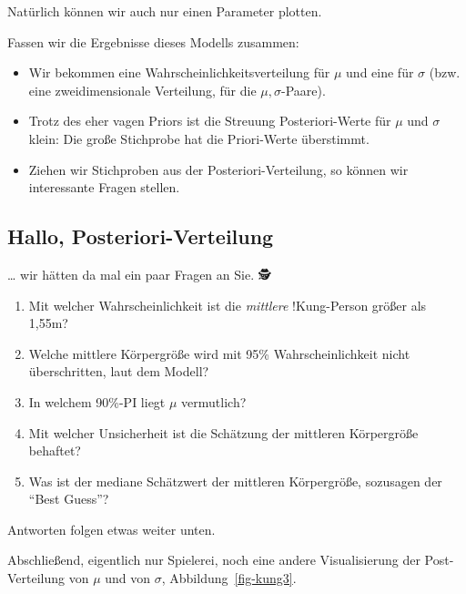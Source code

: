 \documentclass[
  a4paper,
  DIV=11]{scrreprt}
\providecommand{\tightlist}{%
  \setlength{\itemsep}{0pt}\setlength{\parskip}{0pt}}\usepackage{longtable,booktabs,array}
\theoremstyle{definition}
\theoremstyle{remark}
\begin{document}
Natürlich können wir auch nur einen Parameter plotten.

Fassen wir die Ergebnisse dieses Modells zusammen:

\begin{itemize}
\item
  Wir bekommen eine Wahrscheinlichkeitsverteilung für \(\mu\) und eine
  für \(\sigma\) (bzw. eine zweidimensionale Verteilung, für die
  \(\mu,\sigma\)-Paare).
\item
  Trotz des eher vagen Priors ist die Streuung Posteriori-Werte für
  \(\mu\) und \(\sigma\) klein: Die große Stichprobe hat die
  Priori-Werte überstimmt.
\item
  Ziehen wir Stichproben aus der Posteriori-Verteilung, so können wir
  interessante Fragen stellen.
\end{itemize}

\hypertarget{hallo-posteriori-verteilung}{%
\subsection{Hallo,
Posteriori-Verteilung}\label{hallo-posteriori-verteilung}}

\ldots{} wir hätten da mal ein paar Fragen an Sie. 🕵

\begin{enumerate}
\def\labelenumi{\arabic{enumi}.}
\tightlist
\item
  Mit welcher Wahrscheinlichkeit ist die \emph{mittlere} !Kung-Person
  größer als 1,55m?
\item
  Welche mittlere Körpergröße wird mit 95\% Wahrscheinlichkeit nicht
  überschritten, laut dem Modell?
\item
  In welchem 90\%-PI liegt \(\mu\) vermutlich?
\item
  Mit welcher Unsicherheit ist die Schätzung der mittleren Körpergröße
  behaftet?
\item
  Was ist der mediane Schätzwert der mittleren Körpergröße, sozusagen
  der ``Best Guess''?
\end{enumerate}

Antworten folgen etwas weiter unten.

Abschließend, eigentlich nur Spielerei, noch eine andere Visualisierung
der Post-Verteilung von \(\mu\) und von \(\sigma\),
Abbildung~\ref{fig-kung3}.
\end{document}
